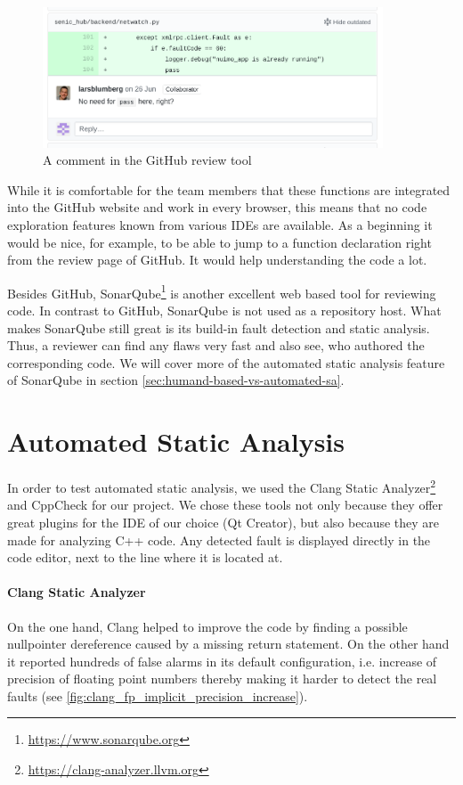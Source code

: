 \documentclass{scrreprt}
\begin{document}
\begin{figure}[h]
	\centering
	\includegraphics[width=0.9\textwidth]{img/github_review_comment}
	\caption[GitHub Review Comment]{A comment in the GitHub review tool}
	\label{fig:github_review_comment}
\end{figure}

While it is comfortable for the team members that these functions are integrated into the GitHub website and work in every browser, this means that no code exploration features known from various IDEs are available. As a beginning it would be nice, for example, to be able to jump to a function declaration right from the review page of GitHub. It would help understanding the code a lot.

Besides GitHub, SonarQube\footnote{\url{https://www.sonarqube.org}} is another excellent web based tool for reviewing code. In contrast to GitHub, SonarQube is not used as a repository host. What makes SonarQube still great is its build-in fault detection and static analysis. Thus, a reviewer can find any flaws very fast and also see, who authored the corresponding code. We will cover more of the automated static analysis feature of SonarQube in section \ref{sec:humand-based-vs-automated-sa}.

\section{Automated Static Analysis}

In order to test automated static analysis, we used the Clang Static Analyzer\footnote{\url{https://clang-analyzer.llvm.org}} and CppCheck for our project. We chose these tools not only because they offer great plugins for the IDE of our choice (Qt Creator), but also because they are made for analyzing C++ code. Any detected fault is displayed directly in the code editor, next to the line where it is located at.

\paragraph{Clang Static Analyzer} On the one hand, Clang helped to improve the code by finding a possible nullpointer dereference caused by a missing return statement. On the other hand it reported hundreds of false alarms in its default configuration, i.e. increase of precision of floating point numbers thereby making it harder to detect the real faults (see \vref{fig:clang_fp_implicit_precision_increase}).
\end{document}
